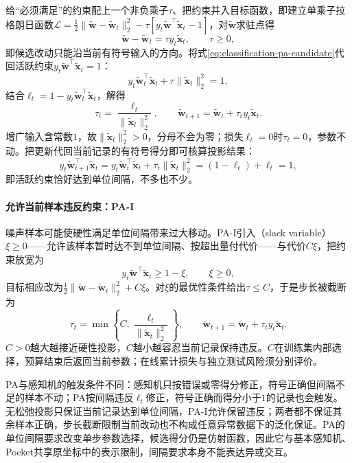 给“必须满足”的约束配上一个非负乘子$\tau$、把约束并入目标函数，即建立单乘子拉格朗日函数$\mathcal L=\tfrac12\|\tilde{\bm{w}}-\tilde{\bm{w}}_t\|_2^2-\tau[y_t\tilde{\bm{w}}^{\top}\tilde{\bm{x}}_t-1]$，对$\tilde{\bm{w}}$求驻点得
\begin{equation}
  \tilde{\bm{w}}-\tilde{\bm{w}}_t=\tau y_t\tilde{\bm{x}}_t,
  \qquad \tau\geq0,
  \label{eq:classification-pa-candidate}
\end{equation}
即候选改动只能沿当前有符号输入的方向。将式\eqref{eq:classification-pa-candidate}代回活跃约束$y_t\tilde{\bm{w}}^{\top}\tilde{\bm{x}}_t=1$：
\[
  y_t\tilde{\bm{w}}_t^{\top}\tilde{\bm{x}}_t
    +\tau\|\tilde{\bm{x}}_t\|_2^2=1,
\]
结合$\ell_t=1-y_t\tilde{\bm{w}}_t^{\top}\tilde{\bm{x}}_t$，解得
\begin{equation}
  \tau_t=\frac{\ell_t}{\|\tilde{\bm{x}}_t\|_2^2},
  \qquad
  \tilde{\bm{w}}_{t+1}
    =\tilde{\bm{w}}_t+\tau_t y_t\tilde{\bm{x}}_t .
  \label{eq:classification-pa-update}
\end{equation}
增广输入含常数$1$，故$\|\tilde{\bm{x}}_t\|_2^2>0$，分母不会为零；损失$\ell_t=0$时$\tau_t=0$，参数不动。把更新代回当前记录的有符号得分即可核算投影结果：
\[
  y_t\tilde{\bm{w}}_{t+1}^{\top}\tilde{\bm{x}}_t
    =y_t\tilde{\bm{w}}_t^{\top}\tilde{\bm{x}}_t
      +\tau_t\|\tilde{\bm{x}}_t\|_2^2
    =(1-\ell_t)+\ell_t=1,
\]
即活跃约束恰好达到单位间隔，不多也不少。

\paragraph{允许当前样本违反约束：PA-I}
噪声样本可能使硬性满足单位间隔带来过大移动。PA-I引入（slack variable）$\xi\geq0$——允许该样本暂时达不到单位间隔、按超出量付代价——与代价$C\xi$，把约束放宽为
\begin{equation}
  y_t\tilde{\bm{w}}^{\top}\tilde{\bm{x}}_t\geq1-\xi,
  \qquad \xi\geq0,
  \label{eq:classification-pai-constraint}
\end{equation}
目标相应改为$\tfrac12\|\tilde{\bm{w}}-\tilde{\bm{w}}_t\|_2^2+C\xi$。对$\xi$的最优性条件给出$\tau\leq C$，于是步长被截断为
\begin{equation}
  \tau_t=\min\left\{C,\frac{\ell_t}{\|\tilde{\bm{x}}_t\|_2^2}\right\},
  \qquad
  \tilde{\bm{w}}_{t+1}
    =\tilde{\bm{w}}_t+\tau_t y_t\tilde{\bm{x}}_t .
  \label{eq:classification-pai-update}
\end{equation}
$C>0$越大越接近硬性投影，$C$越小越容忍当前记录保持违反。$C$在训练集内部选择，预算结束后返回当前参数；在线累计损失与独立测试风险须分别评价。

PA与感知机的触发条件不同：感知机只按错误或零得分修正，符号正确但间隔不足的样本不动；PA按间隔违反$\ell_t$修正，符号正确而得分小于$1$的记录也会触发。无松弛投影只保证当前记录达到单位间隔，PA-I允许保留违反；两者都不保证其余样本正确，步长截断限制当前改动也不构成任意异常数据下的泛化保证。PA的单位间隔要求改变单步参数选择，候选得分仍是仿射函数，因此它与基本感知机、Pocket共享原坐标中的表示限制，间隔要求本身不能表达异或交互。
